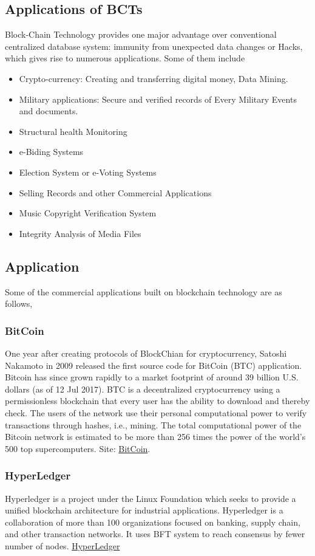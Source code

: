 \subsection{Applications of BCTs}
Block-Chain Technology provides one major advantage over conventional centralized database system: immunity from unexpected data changes or Hacks, which gives rise to numerous applications. Some of them include

\begin{itemize}
\item Crypto-currency: Creating and transferring digital money, Data Mining.
\item Military applications: Secure and verified records of Every Military Events and documents.
\item Structural health Monitoring
\item e-Biding Systems
\item Election System or e-Voting Systems
\item Selling Records and other Commercial Applications
\item Music Copyright Verification System
\item Integrity Analysis of Media Files
\end{itemize}

\subsection{Application}
Some of the commercial applications built on blockchain technology are as follows,

\subsubsection{BitCoin}
One year after creating protocols of BlockChian for cryptocurrency, Satoshi Nakamoto in 2009 released the first source code for BitCoin (BTC) application. Bitcoin has since grown rapidly to a market footprint of around 39 billion U.S. dollars (as of 12 Jul 2017). BTC is a decentralized cryptocurrency using a permissionless blockchain that every user has the ability to download and thereby check. The users of the network use their personal computational power to verify transactions through hashes, i.e., mining. The total computational power of the Bitcoin network is estimated to be more than 256 times the power of the world's 500 top supercomputers.
Site: \href{https://bitcoin.org/}{BitCoin}.

\subsubsection{HyperLedger}
Hyperledger is a project under the Linux Foundation which seeks to provide a unified blockchain architecture for industrial applications. Hyperledger is a collaboration of more than 100 organizations focused on banking, supply chain, and other transaction networks. It uses BFT system to reach consensus by fewer number of nodes.
\href{https://www.hyperledger.org/}{HyperLedger}

